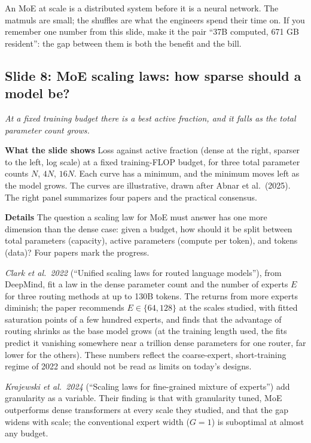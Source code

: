\documentclass[11pt,letterpaper]{article}
\newcommand{\slide}[3]{%
  \subsection[Slide #1: #2]{Slide #1: #2}%
  {\color{muted}\itshape #3\par}\medskip}
\newcommand{\para}[1]{\medskip\noindent\textbf{#1}\quad}
\newenvironment{intuition}{\begin{tcolorbox}[intuitionbox]}{\end{tcolorbox}}
\begin{document}
\begin{intuition}
An MoE at scale is a distributed system before it is a neural network. The matmuls are small; the shuffles are what the engineers spend their time on. If you remember one number from this slide, make it the pair ``37B computed, 671 GB resident'': the gap between them is both the benefit and the bill.
\end{intuition}

\slide{8}{MoE scaling laws: how sparse should a model be?}{At a fixed training budget there is a best active fraction, and it falls as the total parameter count grows.}

\para{What the slide shows} Loss against active fraction (dense at the right, sparser to the left, log scale) at a fixed training-FLOP budget, for three total parameter counts $N$, $4N$, $16N$. Each curve has a minimum, and the minimum moves left as the model grows. The curves are illustrative, drawn after Abnar et al.\ (2025). The right panel summarizes four papers and the practical consensus.

\para{Details} The question a scaling law for MoE must answer has one more dimension than the dense case: given a budget, how should it be split between total parameters (capacity), active parameters (compute per token), and tokens (data)? Four papers mark the progress.

\emph{Clark et al.\ 2022} (``Unified scaling laws for routed language models''), from DeepMind, fit a law in the dense parameter count and the number of experts $E$ for three routing methods at up to 130B tokens. The returns from more experts diminish; the paper recommends $E\in\{64,128\}$ at the scales studied, with fitted saturation points of a few hundred experts, and finds that the advantage of routing shrinks as the base model grows (at the training length used, the fits predict it vanishing somewhere near a trillion dense parameters for one router, far lower for the others). These numbers reflect the coarse-expert, short-training regime of 2022 and should not be read as limits on today's designs.

\emph{Krajewski et al.\ 2024} (``Scaling laws for fine-grained mixture of experts'') add granularity as a variable. Their finding is that with granularity tuned, MoE outperforms dense transformers at every scale they studied, and that the gap widens with scale; the conventional expert width ($G=1$) is suboptimal at almost any budget.
\end{document}
